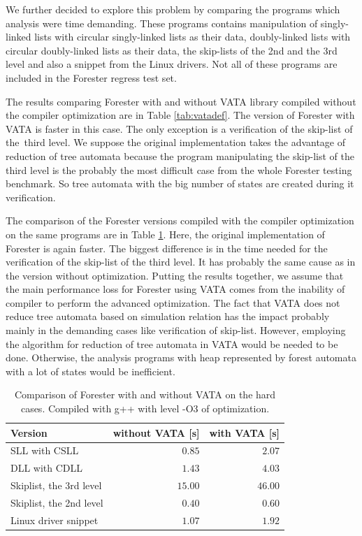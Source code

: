 We further decided to explore this problem by comparing
the programs which analysis were time demanding.
These programs contains manipulation of singly-linked lists with
circular singly-linked lists as their data, doubly-linked lists with
circular doubly-linked lists as their data, the skip-lists of the 2nd and
the 3rd level and also a snippet from the Linux drivers.
Not all of these programs are included in the Forester regress test set.

The results comparing Forester with and without VATA library compiled
without the compiler optimization are in Table \ref{tab:vatadef}.
The version of Forester with VATA is faster in this case.
The only exception is a verification of the skip-list of the~third
level.
We suppose the original implementation takes the advantage of
reduction of tree automata because the program manipulating the skip-list
of the third level is the probably the most difficult case from the whole
Forester testing benchmark.
So tree automata with the big number of states
are created during it verification.

The comparison of the Forester versions compiled with the compiler optimization
on the same programs are in Table \ref{tab:vataopt}.
Here, the original implementation of Forester is again faster.
The biggest difference is in the time needed for the verification of the skip-list of the third level.
It has probably the same cause as in the version without optimization.
Putting the results together, we assume that the main performance
loss for Forester using VATA comes from the inability of compiler
to perform the advanced optimization.
The fact that VATA does not reduce tree automata based on simulation relation
has the impact probably mainly in the demanding cases like verification of skip-list.
However, employing the algorithm for reduction of tree automata in VATA would be
needed to be done.
Otherwise, the analysis programs with heap represented by forest automata
with a lot of states would be inefficient.

\begin{table}[bt]
	\vskip6pt
	\caption{Comparison of Forester with and without VATA on the hard cases.
		Compiled with g++ with level -O3 of optimization.
	}
	\centering
	\begin{tabular}{|l | r | r |}
		\hline
		Version & without VATA [s] & with VATA [s] \\
		\hline
		\hline
		SLL with CSLL            & $0.85$ & $2.07$  \\
		\hline
		DLL with CDLL            & $1.43$ & $4.03$ \\
		\hline
		Skiplist, the 3rd level  & $15.00$ & $46.00$ \\
		\hline
		Skiplist, the 2nd level  & $0.40$ & $0.60$  \\
		\hline
		Linux driver snippet     & $1.07$ & $1.92$  \\ 
		\hline
	\end{tabular}
	\label{tab:vataopt}
\end{table}

